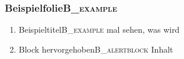 \documentclass[presentation,t]{beamer}
\begin{document}
\subsubsection[Beispielfolie]{Beispielfolie\hfill{}\textsc{B\_example}}
\label{sec:org21c80b2}
\begin{enumerate}
\item Beispieltitel\hfill{}\textsc{B\_example}
\label{sec:org65249c6}
mal sehen, was wird
\item Block hervorgehoben\hfill{}\textsc{B\_alertblock}
\label{sec:org47d8313}
Inhalt
\end{enumerate}
\end{document}
